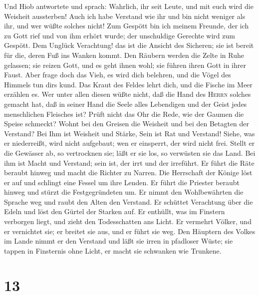  Und Hiob antwortete und sprach:  Wahrlich,
ihr seit Leute, und mit euch wird die Weisheit aussterben!
 Auch ich habe Verstand wie ihr und bin nicht weniger als
ihr, und wer wüßte solches nicht!  Zum Gespött bin ich
meinem Freunde, der ich zu Gott rief und von ihm erhört wurde; der
unschuldige Gerechte wird zum Gespött.  Dem Unglück
Verachtung! das ist die Ansicht des Sicheren; sie ist bereit für die,
deren Fuß ins Wanken kommt.  Den Räubern werden die Zelte
in Ruhe gelassen; sie reizen Gott, und es geht ihnen wohl; sie führen
ihren Gott in ihrer Faust.  Aber frage doch das Vieh, es
wird dich belehren, und die Vögel des Himmels tun dir\textquotesingle s
kund.  Das Kraut des Feldes lehrt dich, und die Fische im
Meer erzählen es.  Wer unter allen diesen wüßte nicht, daß
die Hand des \textsc{Herrn} solches gemacht hat,  daß in
seiner Hand die Seele alles Lebendigen und der Geist jedes menschlichen
Fleisches ist?  Prüft nicht das Ohr die Rede, wie der
Gaumen die Speise schmeckt?  Wohnt bei den Greisen die
Weisheit und bei den Betagten der Verstand?  Bei Ihm ist
Weisheit und Stärke, Sein ist Rat und Verstand!  Siehe,
was er niederreißt, wird nicht aufgebaut; wen er einsperrt, der wird
nicht frei.  Stellt er die Gewässer ab, so vertrocknen
sie; läßt er sie los, so verwüsten sie das Land.  Bei ihm
ist Macht und Verstand; sein ist, der irrt und der irreführt.
 Er führt die Räte beraubt hinweg und macht die Richter
zu Narren.  Die Herrschaft der Könige löst er auf und
schlingt eine Fessel um ihre Lenden.  Er führt die
Priester beraubt hinweg und stürzt die Festgegründeten um.
 Er nimmt den Wohlbewährten die Sprache weg und raubt den
Alten den Verstand.  Er schüttet Verachtung über die
Edeln und löst den Gürtel der Starken auf.  Er enthüllt,
was im Finstern verborgen liegt, und zieht den Todesschatten ans Licht.
 Er vermehrt Völker, und er vernichtet sie; er breitet
sie aus, und er führt sie weg.  Den Häuptern des Volkes
im Lande nimmt er den Verstand und läßt sie irren in pfadloser Wüste;
 sie tappen in Finsternis ohne Licht, er macht sie
schwanken wie Trunkene.

\hypertarget{section-12}{%
\section{13}\label{section-12}}

